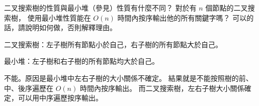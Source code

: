 \startEXERCISE
二叉搜索樹的性質與最小堆（參見\insection[heaps]）性質有什麼不同？
對於有 $n$ 個節點的二叉搜索樹，
使用最小堆性質能在 $O(n)$ 時間內按序輸出他的所有關鍵字嗎？
可以的話，請說明如何做，否則解釋理由。
\stopEXERCISE

\startANSWER
二叉搜索樹：左子樹所有節點小於自己，右子樹的所有節點大於自己。

最小堆：左子樹和右子樹的所有節點均大於自己。

不能。原因是最小堆中左右子樹的大小關係不確定。
結果就是不能按照樹的前、中、後序遍歷在 $O(n)$ 時間內按序輸出。
而二叉搜索樹，左右子樹大小關係確定，可以用中序遍歷按序輸出。
\stopANSWER
